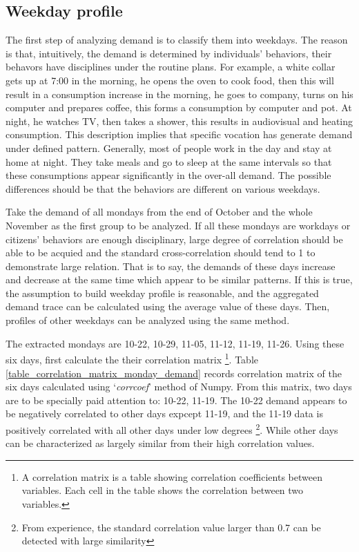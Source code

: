\documentclass[12pt,a4paper]{report}
\begin{document}
                \subsection{Weekday profile}
                The first step of analyzing demand is to classify them into weekdays. The reason is that, intuitively, the demand is determined by individuals' behaviors, their behavors
                have disciplines under the routine plans. For example, a white collar gets up at 7:00 in the morning, he opens the oven to cook food, then this will result in a consumption
                increase in the morning, he goes to company, turns on his computer and prepares coffee, this forms a consumption by computer and pot. At night, he watches TV, then takes a shower, this
                results in audiovisual and heating consumption. This description implies that specific vocation has generate demand under defined pattern. Generally, most of people work in the day and 
                stay at home at night. They take meals and go to sleep at the same intervals so that these consumptions appear significantly in the over-all demand. The possible differences should be
                that the behaviors are different on various weekdays.

                Take the demand of all mondays from the end of October and the whole November as the first group to be analyzed. If all these mondays are workdays or citizens' behaviors are
                enough disciplinary, large degree of correlation should be able to be acquied and the standard cross-correlation should tend to 1 to demonstrate large relation. That is to say, 
                the demands of these days increase and decrease at the same time which appear to be similar patterns. If this is true,
                the assumption to build weekday profile is reasonable, and the aggregated demand trace can be calculated using the average value of these days. Then, profiles of other weekdays can be analyzed using the same method.

                The extracted mondays are 10-22, 10-29, 11-05, 11-12, 11-19, 11-26. Using these six days, first calculate the their correlation matrix \footnote{A correlation matrix is a table showing correlation coefficients between variables. Each cell in the table shows the correlation between two variables.}.
                Table \ref{table_correlation_matrix_monday_demand} records correlation matrix of the six days calculated using `\emph{corrcoef}' method of Numpy. From this matrix, two days are to be specially paid attention to: 10-22, 11-19. The 10-22 demand appears to be negatively correlated to other days expcept 11-19, and the 11-19 data is positively correlated with all other days under low degrees \footnote{From experience, the standard correlation value larger than 0.7 can be detected with large similarity}. While other days can be characterized as largely similar from their high correlation values.
\end{document}
